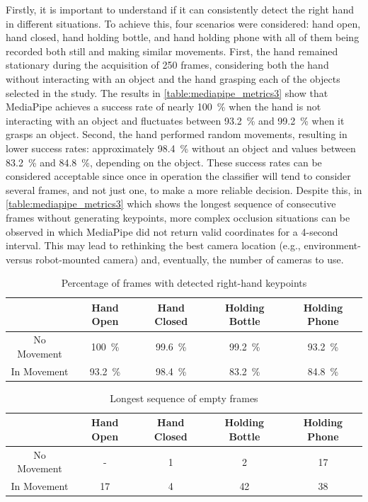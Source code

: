 Firstly, it is important to understand if it can consistently detect the right hand in different situations. To achieve this, four scenarios were considered: hand open, hand closed, hand holding bottle, and hand holding phone with all of them being recorded both still and making similar movements. First, the hand remained stationary during the acquisition of 250 frames, considering both the hand without interacting with an object and the hand grasping each of the objects selected in the study. The results in \autoref{table:mediapipe_metrics3} show that MediaPipe achieves a success rate of nearly \SI{100}{\percent} when the hand is not interacting with an object and fluctuates between \SI{93.2}{\percent} and \SI{99.2}{\percent} when it grasps an object. Second, the hand performed random movements, resulting in lower success rates: approximately \SI{98.4}{\percent} without an object and values between \SI{83.2}{\percent} and \SI{84.8}{\percent}, depending on the object. These success rates can be considered acceptable since once in operation the classifier will tend to consider several frames, and not just one, to make a more reliable decision. Despite this, in \autoref{table:mediapipe_metrics3} which shows the longest sequence of consecutive frames without generating keypoints, more complex occlusion situations can be observed in which MediaPipe did not return valid coordinates for a 4-second interval. This may lead to rethinking the best camera location (e.g., environment- versus robot-mounted camera) and, eventually, the number of cameras to use.

\begin{table}[ht]
    \centering
    \caption{Percentage of frames with detected right-hand keypoints}
    \label{table:mediapipe_metrics3}
    \begin{tabular}{ccccc}
        \toprule
        & Hand Open & Hand Closed & Holding Bottle & Holding Phone \\
        \midrule
        No Movement & \SI{100}{\percent} & \SI{99.6}{\percent} & \SI{99.2}{\percent} & \SI{93.2}{\percent} \\
        In Movement & \SI{93.2}{\percent} & \SI{98.4}{\percent} & \SI{83.2}{\percent} & \SI{84.8}{\percent} \\
        \bottomrule
    \end{tabular}
\end{table}

\newpage

\begin{table}[ht]
    \centering
    \caption{Longest sequence of empty frames}
    \label{table:mediapipe_metrics4}
    \begin{tabular}{ccccc}
        \toprule
        & Hand Open & Hand Closed & Holding Bottle & Holding Phone \\
        \midrule
        No Movement & - & 1 & 2 & 17 \\
        In Movement & 17 & 4 & 42 & 38 \\
        \bottomrule
    \end{tabular}
\end{table}


